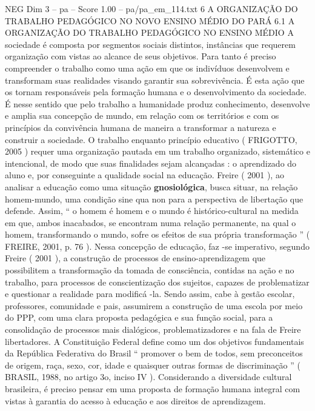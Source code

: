 \begin{textsample}{NEG Dim 3 – pa – Score 1.00 – pa/pa\_em\_114.txt}  \label{ex:f3_neg_055}
6 A ORGANIZAÇÃO DO TRABALHO PEDAGÓGICO NO NOVO ENSINO MÉDIO DO PARÁ 6.1 A ORGANIZAÇÃO DO TRABALHO PEDAGÓGICO NO ENSINO MÉDIO A sociedade é composta por segmentos sociais distintos, instâncias que requerem organização com vistas ao alcance de seus objetivos.
Para tanto é preciso compreender o trabalho como uma ação em que os indivíduos desenvolvem e transformam suas realidades visando garantir sua sobrevivência.
É esta ação que os tornam responsáveis pela formação humana e o desenvolvimento da sociedade.
É nesse sentido que pelo trabalho a humanidade produz conhecimento, desenvolve e amplia sua concepção de mundo, em relação com os territórios e com os princípios da convivência humana de maneira a transformar a natureza e construir a sociedade.
O trabalho enquanto princípio educativo ( FRIGOTTO, 2005 ) requer uma organização pautada em um trabalho organizado, sistemático e intencional, de modo que suas finalidades sejam alcançadas : o aprendizado do aluno e, por conseguinte a qualidade social na educação.
Freire ( 2001 ), ao analisar a educação como uma situação \textbf{gnosiológica}, busca situar, na relação homem-mundo, uma condição sine qua non para a perspectiva de libertação que defende.
Assim, “ o homem é homem e o mundo é histórico-cultural na medida em que, ambos inacabados, se encontram numa relação permanente, na qual o homem, transformando o mundo, sofre os efeitos de sua própria transformação ” ( FREIRE, 2001, p. 76 ).
Nessa concepção de educação, faz -se imperativo, segundo Freire ( 2001 ), a construção de processos de ensino-aprendizagem que possibilitem a transformação da tomada de consciência, contidas na ação e no trabalho, para processos de conscientização dos sujeitos, capazes de problematizar e questionar a realidade para modificá -la.
Sendo assim, cabe à gestão escolar, professores, comunidade e pais, assumirem a construção de uma escola por meio do PPP, com uma clara proposta pedagógica e sua função social, para a consolidação de processos mais dialógicos, problematizadores e na fala de Freire libertadores.
A Constituição Federal define como um dos objetivos fundamentais da República Federativa do Brasil “ promover o bem de todos, sem preconceitos de origem, raça, sexo, cor, idade e quaisquer outras formas de discriminação ” ( BRASIL, 1988, no artigo 3o, inciso IV ).
Considerando a diversidade cultural brasileira, é preciso pensar em uma proposta de formação humana integral com vistas à garantia do acesso à educação e aos direitos de aprendizagem.

\end{textsample}
